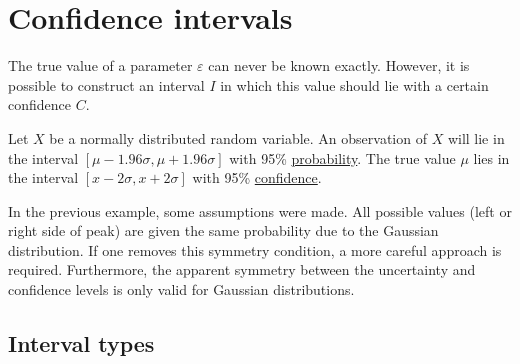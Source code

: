 \section{Confidence intervals}\label{section:confidence}

    The true value of a parameter $\varepsilon$ can never be known exactly. However, it is possible to construct an interval $I$ in which this value should lie with a certain confidence $C$.
    \begin{example}
        Let $X$ be a normally distributed random variable. An observation of $X$ will lie in the interval $[\mu - 1.96\sigma,\mu+1.96\sigma]$ with 95\% \underline{probability}. The true value $\mu$ lies in the interval $[x - 2\sigma, x+2\sigma]$ with 95\% \underline{confidence}.
    \end{example}
    \begin{remark*}
        In the previous example, some assumptions were made. All possible values (left or right side of peak) are given the same probability due to the Gaussian distribution. If one removes this symmetry condition, a more careful approach is required. Furthermore, the apparent symmetry between the uncertainty and confidence levels is only valid for Gaussian distributions.
    \end{remark*}

\subsection{Interval types}


